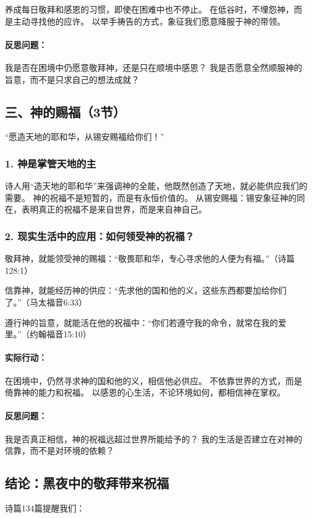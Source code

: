 \documentclass[a4paper, 12pt]{article}
\begin{document}
养成每日敬拜和感恩的习惯，即使在困难中也不停止。
在低谷时，不埋怨神，而是主动寻找他的应许。
以举手祷告的方式，象征我们愿意降服于神的带领。
\paragraph*{反思问题：}

我是否在困境中仍愿意敬拜神，还是只在顺境中感恩？
我是否愿意全然顺服神的旨意，而不是只求自己的想法成就？
\subsection*{三、神的赐福（3节）}
“愿造天地的耶和华，从锡安赐福给你们！”

\subsubsection*{1. 神是掌管天地的主}
诗人用“造天地的耶和华”来强调神的全能，他既然创造了天地，就必能供应我们的需要。
神的祝福不是短暂的，而是有永恒价值的。
从锡安赐福：锡安象征神的同在，表明真正的祝福不是来自世界，而是来自神自己。
\subsubsection*{2. 现实生活中的应用：如何领受神的祝福？}
\hspace{0.6cm}敬拜神，就能领受神的赐福：“敬畏耶和华，专心寻求他的人便为有福。”（诗篇128:1）

信靠神，就能经历神的供应：“先求他的国和他的义，这些东西都要加给你们了。”（马太福音6:33）

遵行神的旨意，就能活在他的祝福中：“你们若遵守我的命令，就常在我的爱里。”（约翰福音15:10）

\paragraph*{实际行动：}

在困境中，仍然寻求神的国和他的义，相信他必供应。
不依靠世界的方式，而是倚靠神的能力和祝福。
以感恩的心生活，不论环境如何，都相信神在掌权。
\paragraph*{反思问题：}

我是否真正相信，神的祝福远超过世界所能给予的？
我的生活是否建立在对神的信靠，而不是对环境的依赖？
\subsection*{结论：黑夜中的敬拜带来祝福}
诗篇134篇提醒我们：
\end{document}
